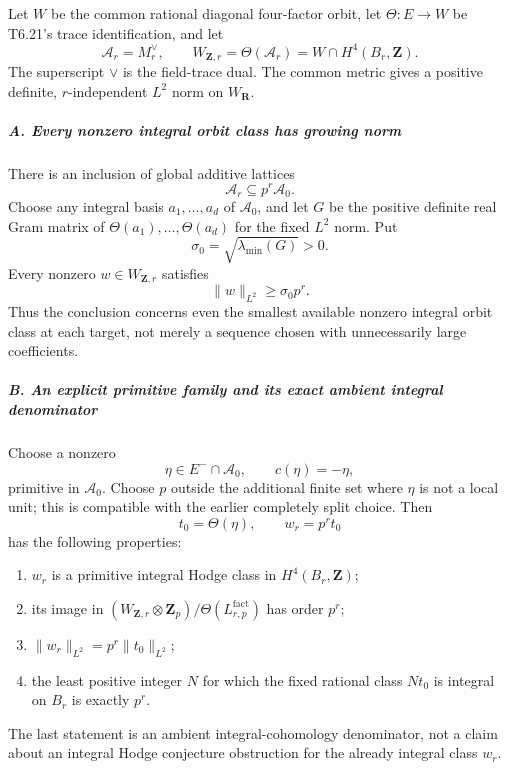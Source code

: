 Let \(W\) be the common rational diagonal four-factor orbit, let \(\Theta:E\to W\) be T6.21's trace identification, and let \[
 \mathcal A_r=M_r^\vee,\qquad
 W_{\mathbf Z,r}=\Theta(\mathcal A_r)
                =W\cap H^4(B_r,\mathbf Z).
 \tag{T23.2}
\] The superscript \(\vee\) is the field-trace dual. The common metric gives a positive definite, \(r\)-independent \(L^2\) norm on \(W_{\mathbf R}\).

\subparagraph{A. Every nonzero integral orbit class has growing norm}\label{a.-every-nonzero-integral-orbit-class-has-growing-norm}

There is an inclusion of global additive lattices \[
 \mathcal A_r\subseteq p^r\mathcal A_0.
 \tag{T23.3}
\] Choose any integral basis \(a_1,\ldots,a_d\) of \(\mathcal A_0\), and let \(G\) be the positive definite real Gram matrix of \(\Theta(a_1),\ldots,\Theta(a_d)\) for the fixed \(L^2\) norm. Put \[
 \sigma_0=\sqrt{\lambda_{\min}(G)}>0.
 \tag{T23.4}
\] Every nonzero \(w\in W_{\mathbf Z,r}\) satisfies \[
 \|w\|_{L^2}\ge \sigma_0 p^r.
 \tag{T23.5}
\] Thus the conclusion concerns even the smallest available nonzero integral orbit class at each target, not merely a sequence chosen with unnecessarily large coefficients.

\subparagraph{B. An explicit primitive family and its exact ambient integral denominator}\label{b.-an-explicit-primitive-family-and-its-exact-ambient-integral-denominator}

Choose a nonzero \[
 \eta\in E^-\cap\mathcal A_0,\qquad c(\eta)=-\eta,
\] primitive in \(\mathcal A_0\). Choose \(p\) outside the additional finite set where \(\eta\) is not a local unit; this is compatible with the earlier completely split choice. Then \[
 t_0=\Theta(\eta),\qquad w_r=p^r t_0
 \tag{T23.6}
\] has the following properties:

\begin{enumerate}
\def\labelenumi{\arabic{enumi}.}
\tightlist
\item
  \(w_r\) is a primitive integral Hodge class in \(H^4(B_r,\mathbf Z)\);
\item
  its image in \((W_{\mathbf Z,r}\otimes\mathbf Z_p)/\Theta(L^{\mathrm{fact}}_{r,p})\) has order \(p^r\);
\item
  \(\|w_r\|_{L^2}=p^r\|t_0\|_{L^2}\);
\item
  the least positive integer \(N\) for which the fixed rational class \(Nt_0\) is integral on \(B_r\) is exactly \(p^r\).
\end{enumerate}

The last statement is an ambient integral-cohomology denominator, not a claim about an integral Hodge conjecture obstruction for the already integral class \(w_r\).

